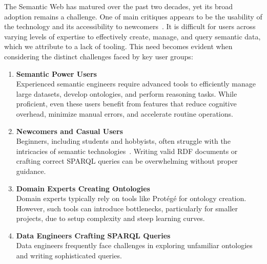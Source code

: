 The Semantic Web has matured over the past two decades, yet its broad adoption remains a challenge.
One of main critiques appears to be the usability of the technology and its accessibility to newcomers~\cite{10.3233/SW-190387}. 
It is difficult for users across varying levels of expertise to effectively create, manage, and query semantic data, which we attribute to a lack of tooling.
This need becomes evident when considering the distinct challenges faced by key user groups:

\begin{enumerate}
  \item \textbf{Semantic Power Users}\\
    Experienced semantic engineers require advanced tools to efficiently manage large datasets, develop ontologies, and perform reasoning tasks.
    While proficient, even these users benefit from features that reduce cognitive overhead, minimize manual errors, and accelerate routine operations.

  \item \textbf{Newcomers and Casual Users}\\
    Beginners, including students and hobbyists, often struggle with the intricacies of semantic technologies~\cite{EvensteinSigalov2023,Turki2021RepresentingCI}. 
    Writing valid RDF documents or crafting correct SPARQL queries can be overwhelming without proper guidance. 

\item \textbf{Domain Experts Creating Ontologies}\\
    Domain experts typically rely on tools like Protégé for ontology creation. 
    However, such tools can introduce bottlenecks, particularly for smaller projects, due to setup complexity and steep learning curves. 

  \item \textbf{Data Engineers Crafting SPARQL Queries}\\
    Data engineers frequently face challenges in exploring unfamiliar ontologies and writing sophisticated queries. 
\end{enumerate}

